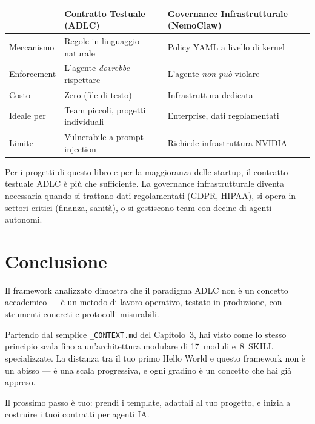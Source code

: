 \begin{center}
\begin{tabularx}{\textwidth}{l X X}
\toprule
& \textbf{Contratto Testuale (ADLC)} & \textbf{Governance Infrastrutturale (NemoClaw)} \\
\midrule
Meccanismo & Regole in linguaggio naturale & Policy YAML a livello di kernel \\
Enforcement & L'agente \textit{dovrebbe} rispettare & L'agente \textit{non può} violare \\
Costo & Zero (file di testo) & Infrastruttura dedicata \\
Ideale per & Team piccoli, progetti individuali & Enterprise, dati regolamentati \\
Limite & Vulnerabile a prompt injection & Richiede infrastruttura NVIDIA \\
\bottomrule
\end{tabularx}
\end{center}

\begin{notebox}
Per i progetti di questo libro e per la maggioranza delle startup, il contratto testuale ADLC è più che sufficiente. La governance infrastrutturale diventa necessaria quando si trattano dati regolamentati (GDPR, HIPAA), si opera in settori critici (finanza, sanità), o si gestiscono team con decine di agenti autonomi.
\end{notebox}

\section*{Conclusione}

Il framework analizzato dimostra che il paradigma ADLC non è un concetto accademico --- è un metodo di lavoro operativo, testato in produzione, con strumenti concreti e protocolli misurabili.

Partendo dal semplice \texttt{\_CONTEXT.md} del Capitolo~3, hai visto come lo stesso principio scala fino a un'architettura modulare di 17~moduli e~8~SKILL specializzate. La distanza tra il tuo primo Hello World e questo framework non \`e un abisso --- \`e una scala progressiva, e ogni gradino \`e un concetto che hai gi\`a appreso.

Il prossimo passo è tuo: prendi i template, adattali al tuo progetto, e inizia a costruire i tuoi contratti per agenti IA.
